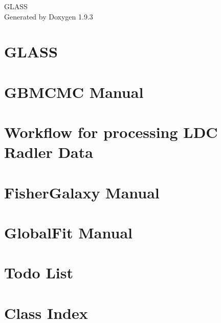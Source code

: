 \documentclass[twoside]{book}
\newcommand{\+}{\discretionary{\mbox{\scriptsize$\hookleftarrow$}}{}{}}
\newcommand{\clearemptydoublepage}{%
    \newpage{\pagestyle{empty}\cleardoublepage}%
  }
\begin{document}
  \raggedbottom
    \hypersetup{pageanchor=false,
                bookmarksnumbered=true,
                pdfencoding=unicode
               }
  \begin{titlepage}
  \vspace*{7cm}
  \begin{center}%
  {\Large GLASS}\\
  \vspace*{1cm}
  {\large Generated by Doxygen 1.9.3}\\
  \end{center}
  \end{titlepage}
  \clearemptydoublepage
  \tableofcontents
  \clearemptydoublepage
  \hypersetup{pageanchor=true}
\chapter{GLASS}
\label{index}\hypertarget{index}{}
\chapter{GBMCMC Manual}
\label{md_gbmcmc_README}

\chapter{Workflow for processing LDC Radler Data}
\label{md_gbmcmc_README_LDC}

\chapter{Fisher\+Galaxy Manual}
\label{md_gbfisher_README}

\chapter{Global\+Fit Manual}
\label{md_globalfit_README}

\chapter{Todo List}
\label{todo}

\chapter{Class Index}

\end{document}
